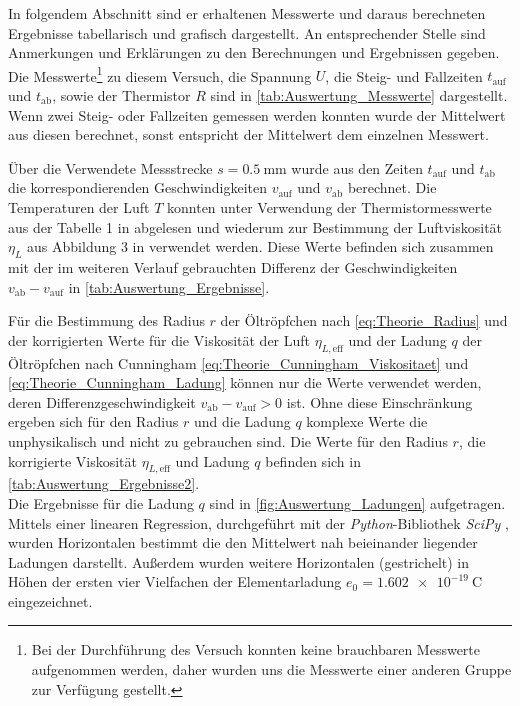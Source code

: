 In folgendem Abschnitt sind er erhaltenen Messwerte und daraus berechneten
Ergebnisse tabellarisch und grafisch dargestellt.
An entsprechender Stelle sind Anmerkungen und Erklärungen zu den Berechnungen 
und Ergebnissen gegeben.\\

Die Messwerte\footnote{Bei der Durchführung des Versuch konnten keine brauchbaren
Messwerte aufgenommen werden, daher wurden uns die Messwerte einer anderen Gruppe zur 
Verfügung gestellt.} zu diesem Versuch, die Spannung $U$, die Steig- und Fallzeiten $t_{\text{auf}}$ und 
$t_{\text{ab}}$, sowie der Thermistor $R$ sind in \cref{tab:Auswertung_Messwerte} dargestellt. 
Wenn zwei Steig- oder Fallzeiten gemessen werden konnten wurde der Mittelwert aus diesen berechnet,
sonst entspricht der Mittelwert dem einzelnen Messwert.
 
 
 



Über die Verwendete Messstrecke $s = \SI{0.5}{\mm}$ wurde aus den Zeiten $t_{\text{auf}}$ und $t_{\text{ab}}$ die
korrespondierenden Geschwindigkeiten $v_{\text{auf}}$ und $v_{\text{ab}}$ berechnet. Die Temperaturen der Luft 
$T$ konnten unter Verwendung der Thermistormesswerte aus der Tabelle 1 in \cite{V503} abgelesen und
wiederum zur Bestimmung der Luftviskosität $\eta_{L}$ aus Abbildung 3 in \cite{V503} verwendet werden.
Diese Werte befinden sich zusammen mit der im weiteren Verlauf gebrauchten Differenz der Geschwindigkeiten 
$v_{\text{ab}} - v_{\text{auf}}$ in \cref{tab:Auswertung_Ergebnisse}.  
 
	

Für die Bestimmung des Radius $r$ der Öltröpfchen nach \cref{eq:Theorie_Radius} und der korrigierten Werte für 
die Viskosität der Luft $\eta_{L,\text{eff}}$  und der Ladung $q$ der Öltröpfchen nach Cunningham \cref{eq:Theorie_Cunningham_Viskositaet} und \cref{eq:Theorie_Cunningham_Ladung} 
können nur die Werte verwendet werden, deren Differenzgeschwindigkeit $v_{\text{ab}} - v_{\text{auf}} > 0$ ist.
Ohne diese Einschränkung ergeben sich für den Radius $r$ und die Ladung $q$ komplexe Werte die unphysikalisch und 
nicht zu gebrauchen sind.
Die Werte für den Radius $r$, die korrigierte Viskosität $\eta_{L, \text{eff}}$ und Ladung $q$  befinden sich in 
\cref{tab:Auswertung_Ergebnisse2}.\\

	     
	 
Die Ergebnisse für die Ladung $q$ sind in \cref{fig:Auswertung_Ladungen} aufgetragen. Mittels einer linearen Regression,
durchgeführt mit der \emph{Python}-Bibliothek \emph{SciPy} \cite{SciPy},
wurden Horizontalen bestimmt die den Mittelwert nah beieinander liegender Ladungen darstellt.
Außerdem wurden weitere Horizontalen (gestrichelt) in Höhen der ersten vier Vielfachen der
Elementarladung $e_{0} = \SI{1.602e-19}{\coulomb}$ \cite{Mende09} eingezeichnet.


